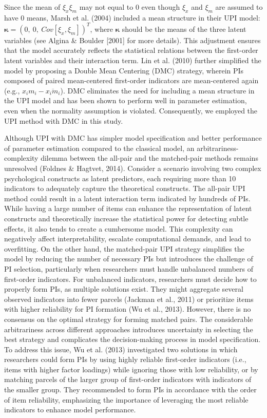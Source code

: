 \documentclass[
  man]{apa6}
\begin{document}
Since the mean of \(\xi_{x}\xi_{m}\) may not equal to 0 even though \(\xi_{x}\) and \(\xi_{m}\) are assumed to have 0 means, Marsh et al. (2004) included a mean structure in their UPI model: \(\mathbf{\kappa} = (0,\ 0,\ Cov[\xi_{x}, \xi_{m}])^T\), where \(\mathbf{\kappa}\) should be the means of the three latent variables (see Algina \& Boulder {[}2001{]} for more details). This adjustment ensures that the model accurately reflects the statistical relations between the first-order latent variables and their interaction term. Lin et al. (2010) further simplified the model by proposing a Double Mean Centering (DMC) strategy, wherein PIs composed of paired mean-centered first-order indicators are mean-centered again (e.g., \(x_{i}m_{i} - \overline{x_{i}m_{i}}\)). DMC eliminates the need for including a mean structure in the UPI model and has been shown to perform well in parameter estimation, even when the normality assumption is violated. Consequently, we employed the UPI method with DMC in this study.

Although UPI with DMC has simpler model specification and better performance of parameter estimation compared to the classical model, an arbitrariness-complexity dilemma between the all-pair and the matched-pair methods remains unresolved (Foldnes \& Hagtvet, 2014). Consider a scenario involving two complex psychological constructs as latent predictors, each requiring more than 10 indicators to adequately capture the theoretical constructs. The all-pair UPI method could result in a latent interaction term indicated by hundreds of PIs. While having a large number of items can enhance the representation of latent constructs and theoretically increase the statistical power for detecting subtle effects, it also tends to create a cumbersome model. This complexity can negatively affect interpretability, escalate computational demands, and lead to overfitting. On the other hand, the matched-pair UPI strategy simplifies the model by reducing the number of necessary PIs but introduces the challenge of PI selection, particularly when researchers must handle unbalanced numbers of first-order indicators. For unbalanced indicators, researchers must decide how to properly form PIs, as multiple solutions exist. They might aggregate several observed indicators into fewer parcels (Jackman et al., 2011) or prioritize items with higher reliability for PI formation (Wu et al., 2013). However, there is no consensus on the optimal strategy for forming matched pairs. The considerable arbitrariness across different approaches introduces uncertainty in selecting the best strategy and complicates the decision-making process in model specification. To address this issue, Wu et al. (2013) investigated two solutions in which researchers could form PIs by using highly reliable first-order indicators (i.e., items with higher factor loadings) while ignoring those with low reliability, or by matching parcels of the larger group of first-order indicators with indicators of the smaller group. They recommended to form PIs in accordance with the order of item reliability, emphasizing the importance of leveraging the most reliable indicators to enhance model performance.
\end{document}
